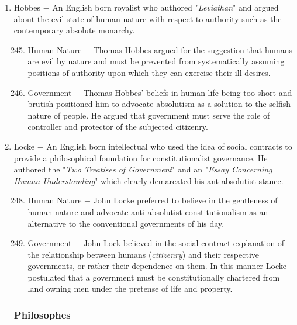 \documentclass[12pt]{article}
\begin{document}
\begin{enumerate}
\item Hobbes $-$ An English born royalist who authored "\textit{Leviathan}" and argued about the evil state of human nature with respect to authority such as the contemporary absolute monarchy.

\begin{enumerate}[label=\arabic{*}.]
\setcounter{enumii}{244}

\item Human Nature $-$ Thomas Hobbes argued for the suggestion that humans are evil by nature and must be prevented from systematically assuming positions of authority upon which they can exercise their ill desires.

\item Government $-$ Thomas Hobbes' beliefs in human life being too short and brutish positioned him to advocate absolutism as a solution to the selfish nature of people. He argued that government must serve the role of controller and protector of the subjected citizenry.

\end{enumerate}
\setcounter{enumi}{246}

\item Locke $-$ An English born intellectual who used the idea of social contracts to provide a philosophical foundation for constitutionalist governance. He authored the "\textit{Two Treatises of Government}" and an "\textit{Essay Concerning Human Understanding}" which clearly demarcated his ant-absolutist stance.

\begin{enumerate}[label=\arabic{*}.]
\setcounter{enumii}{247}

\item Human Nature $-$ John Locke preferred to believe in the gentleness of human nature and advocate anti-absolutist constitutionalism as an alternative to the conventional governments of his day.

\item Government $-$ John Lock believed in the social contract explanation of the relationship between humans (\textit{citizenry}) and their respective governments, or rather their dependence on them. In this manner Locke postulated that a government must be constitutionally chartered from land owning men under the pretense of life and property.

\end{enumerate}
\setcounter{enumi}{249}
\subsubsection{Philosophes}


\end{enumerate}
\end{document}
